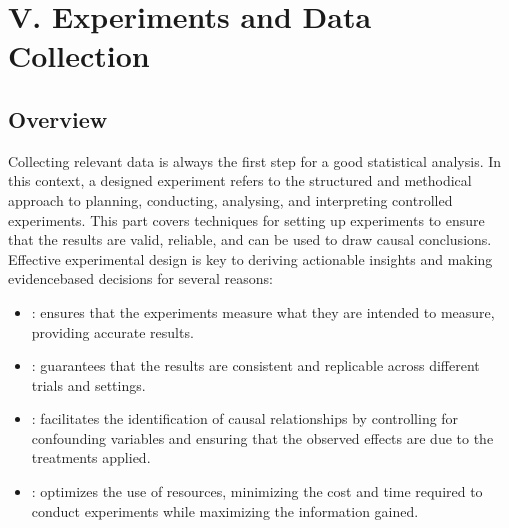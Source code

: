 \documentclass[letterpaper,10pt,english]{jupyterBook}
\begin{document}
\sphinxstepscope


\part{V. Experiments and Data Collection}

\sphinxstepscope


\chapter{Overview}
\label{\detokenize{notebooks/preface_designs:overview}}\label{\detokenize{notebooks/preface_designs::doc}}
\sphinxAtStartPar
Collecting relevant data is always the first step for a good statistical analysis. In this context, a designed experiment refers to the structured and methodical approach to planning, conducting, analysing, and interpreting controlled experiments. This part covers techniques for setting up experiments to ensure that the results are valid, reliable, and can be used to draw causal conclusions. Effective experimental design is key to deriving actionable insights and making evidence\sphinxhyphen{}based decisions for several reasons:
\begin{itemize}
\item {} 
\sphinxAtStartPar
{}: ensures that the experiments measure what they are intended to measure, providing accurate results.

\item {} 
\sphinxAtStartPar
{}: guarantees that the results are consistent and replicable across different trials and settings.

\item {} 
\sphinxAtStartPar
{}: facilitates the identification of causal relationships by controlling for confounding variables and ensuring that the observed effects are due to the treatments applied.

\item {} 
\sphinxAtStartPar
{}: optimizes the use of resources, minimizing the cost and time required to conduct experiments while maximizing the information gained.

\end{itemize}
\end{document}
